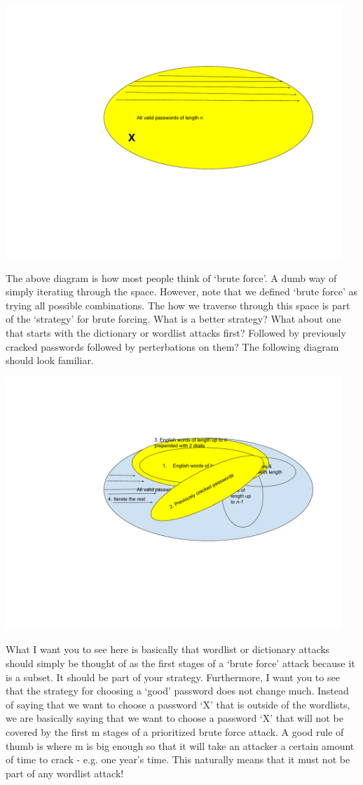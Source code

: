 \includegraphics[width=5in]{Assignments/images/PasswordCracking_9}

The above diagram is how most people think of ‘brute force’. A dumb way of simply iterating through the space. However, note that we defined ‘brute force’ as trying all possible combinations. The how we traverse through this space is part of the ‘strategy’ for brute forcing. What is a better strategy? What about one that starts with the dictionary or wordlist attacks first? Followed by previously cracked passwords followed by perterbations on them? The following diagram should look familiar.

\includegraphics[width=5in]{Assignments/images/PasswordCracking_10}

What I want you to see here is basically that wordlist or dictionary attacks should simply be thought of as the first stages of a ‘brute force’ attack because it is a subset. It should be part of your strategy. Furthermore, I want you to see that the strategy for choosing a ‘good’ password does not change much. Instead of saying that we want to choose a password ‘X’ that is outside of the wordlists, we are basically saying that we want to choose a password ‘X’ that will not be covered by the first m stages of a prioritized brute force attack. A good rule of thumb is where m is big enough so that it will take an attacker a certain amount of time to crack - e.g. one year’s time. This naturally means that it must not be part of any wordlist attack!

